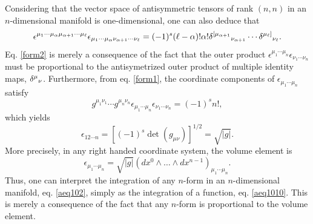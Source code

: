 \documentclass[
12pt,		%
openright,	%
twoside,  %
a4paper,			%
chapter=TITLE,		%
english,			%
french,				%
spanish,			%
brazil				%
]{USPSC-classe/USPSC}
\begin{document}
\begin{apendicesenv}
Considering that the vector space of antisymmetric tensors of rank $(n,n)$ in an $n$-dimensional manifold is one-dimensional, one can also deduce that
\begin{equation}\label{form2}
    \epsilon^{\mu_1\cdots\mu_{\alpha}\mu_{\alpha+1}\cdots\mu_{\ell}}\epsilon_ {\mu_1\cdots\mu_{\alpha}\nu_{\alpha+1}\cdots\nu_{\ell}}=(-1)^s(\ell-\alpha)!\alpha!\delta^{[\mu_{\alpha+1}}\mathstrut_{\nu_{\alpha+1}}\cdots\delta^{\mu_{\ell}]}\mathstrut_{\nu_{\ell}}.
\end{equation}
Eq. \ref{form2} is merely a consequence of the fact that the outer product $\epsilon^{\mu_1\cdots\mu_{n}}\epsilon_{\nu_1\cdots\nu_{n}}$ must be proportional to the antisymetrized outer product of multiple identity maps, $\delta^{\mu}\mathstrut_{\nu}$. Furthermore, from eq. \ref{form1}, the coordinate components of $\epsilon_{\mu_1\cdots\mu_{n}}$ satisfy
\begin{equation}
    g^{\mu_1\nu_1}\cdots g^{\mu_n\nu_n}\epsilon_{\mu_1\cdots\mu_{n}}\epsilon_{\nu_1\cdots\nu_{n}}=(-1)^sn!,
\end{equation}
which yields
\begin{equation}
    \epsilon_{12\cdots n}=[(-1)^s\det(g_{\mu\nu})]^{1/2}=\sqrt{|g|}.
\end{equation}
More precisely, in any right handed coordinate system, the volume element is
\begin{equation}\label{volumeexplicit}
    \epsilon_{\mu_1\cdots\mu_{n}}=\sqrt{|g|}(dx^{0}\wedge\ldots\wedge dx^{n-1})_{\mu_1\cdots\mu_{n}}.
\end{equation}
Thus, one can interpret the integration of any $n$-form in an $n$-dimensional manifold, eq. \ref{aeq102}, simply as the integration of a function, eq. \ref{aeq1010}. This is merely a consequence of the fact that any $n$-form is proportional to the volume element. 


\end{apendicesenv}
\end{document}
